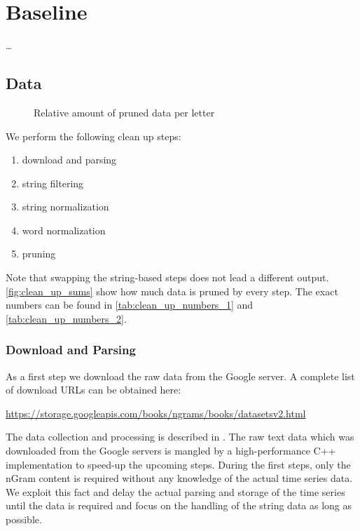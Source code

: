 \chapter{Baseline}
\label{ch:baseline}

\dots



\section{Data}
\label{sec:baseline:data}

\begin{figure}
    \centering
    
    \caption{Relative amount of pruned data per letter}
    \label{fig:clean_up_sums}
\end{figure}

We perform the following clean up steps:

\begin{enumerate}
    \itemsep0em
    \item download and parsing
    \item string filtering
    \item string normalization
    \item word normalization
    \item pruning
\end{enumerate}

Note that swapping the string-based steps does not lead a different output. \autoref{fig:clean_up_sums} show how much data is pruned by every step. The exact numbers can be found in \autoref{tab:clean_up_numbers_1} and \autoref{tab:clean_up_numbers_2}.


\subsection{Download and Parsing}
\label{ssec:baseline:data:download}
As a first step we download the raw data from the Google server. A complete list of download URLs can be obtained here:

\url{https://storage.googleapis.com/books/ngrams/books/datasetsv2.html}

The data collection and processing is described in \cite{Google_nGrams}. The raw text data which was downloaded from the Google servers is mangled by a high-performance C++ implementation to speed-up the upcoming steps. During the first steps, only the nGram content is required without any knowledge of the actual time series data. We exploit this fact and delay the actual parsing and storage of the time series until the data is required and focus on the handling of the string data as long as possible.


